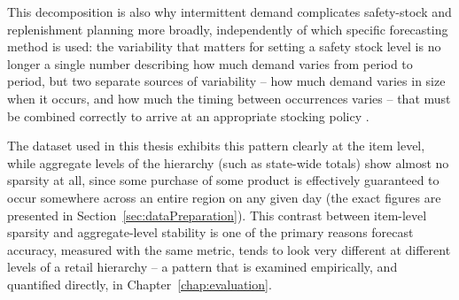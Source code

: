 This decomposition is also why intermittent demand complicates safety-stock and replenishment planning more broadly, independently of which specific forecasting method is used: the variability that matters for setting a safety stock level is no longer a single number describing how much demand varies from period to period, but two separate sources of variability -- how much demand varies in size when it occurs, and how much the timing between occurrences varies -- that must be combined correctly to arrive at an appropriate stocking policy \cite{Silver:1998}.

The dataset used in this thesis exhibits this pattern clearly at the item level, while aggregate levels of the hierarchy (such as state-wide totals) show almost no sparsity at all, since some purchase of some product is effectively guaranteed to occur somewhere across an entire region on any given day (the exact figures are presented in Section~\ref{sec:dataPreparation}). This contrast between item-level sparsity and aggregate-level stability is one of the primary reasons forecast accuracy, measured with the same metric, tends to look very different at different levels of a retail hierarchy -- a pattern that is examined empirically, and quantified directly, in Chapter~\ref{chap:evaluation}.